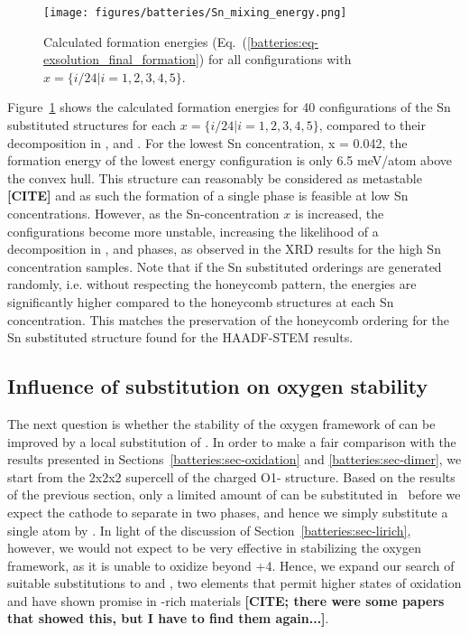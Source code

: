 \begin{refsection}
\begin{figure}[h]
\centering
\texttt{[image: figures/batteries/Sn\_mixing\_energy.png]}
\caption{Calculated formation energies (Eq.~(\ref{batteries:eq-exsolution_final_formation}) for all configurations with $x = \{i/24|i=1,2,3,4,5\}$.}
\label{batteries:fig-Sn_mixing}
\end{figure}

Figure~\ref{batteries:fig-Sn_mixing} shows the calculated formation energies for 40 configurations of the Sn substituted structures for each $x = \{i/24|i=1,2,3,4,5\}$, compared to their decomposition in ,  and . For the lowest Sn concentration, x = 0.042, the formation energy of the lowest energy configuration is only 6.5 meV/atom above the convex hull. This structure can reasonably be considered as metastable \textbf{[CITE]} and as such the formation of a single phase is feasible at low Sn concentrations. However, as the Sn-concentration $x$ is increased, the  configurations become more unstable, increasing the likelihood of a decomposition in ,  and  phases, as observed in the XRD results for the high Sn concentration samples. Note that if the Sn substituted orderings are generated randomly, i.e. without respecting the honeycomb pattern, the energies are significantly higher compared to the honeycomb structures at each Sn concentration. This matches the preservation of the honeycomb ordering for the Sn substituted structure found for the HAADF-STEM results.

\subsection{Influence of  substitution on oxygen stability} \label{batteries:sec-dimer_substitution}

The next question is whether the stability of the oxygen framework of  can be improved by a local substitution of . In order to make a fair comparison with the results presented in Sections~\ref{batteries:sec-oxidation} and \ref{batteries:sec-dimer}, we start from the 2x2x2 supercell of the charged O1- structure. Based on the results of the previous section, only a limited amount of  can be substituted in~ before we expect the cathode to separate in two phases, and hence we simply substitute a single  atom by . In light of the discussion of Section~\ref{batteries:sec-lirich},  however, we would not expect  to be very effective in stabilizing the oxygen framework, as it is unable to oxidize beyond +4. Hence, we expand our search of suitable substitutions to  and , two elements that permit higher states of oxidation and have shown promise in -rich materials \textbf{[CITE; there were some papers that showed this, but I have to find them again...]}.


\end{refsection}
